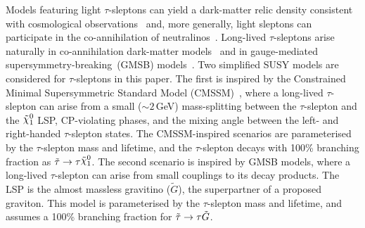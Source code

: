 Models featuring light $\tau$-sleptons can yield a dark-matter relic density consistent with cosmological observations~\cite{Vasquez:2011} and, more generally, light sleptons can participate in the co-annihilation of neutralinos~\cite{Belanger:2004ag,King:2007vh}. Long-lived $\tau$-sleptons arise naturally in co-annihilation dark-matter models~\cite{Ellis:1998kh,Jittoh:2005pq,Kaneko:2008re} and in gauge-mediated supersymmetry-breaking~(GMSB) 
models~\cite{Dine:1981gu,AlvarezGaume:1981wy,Nappi:1982hm}.
Two simplified SUSY models are considered for $\tau$-sleptons in this paper. The first is inspired by the Constrained Minimal Supersymmetric Standard Model (CMSSM)~\cite{Chamseddine:1982jx,Barbieri:1982eh,Kane:1993td}, where a long-lived $\tau$-slepton can arise from a small (${\sim}2$\,GeV) mass-splitting between the $\tau$-slepton and the $\ninoone$ LSP, CP-violating phases, and the mixing angle between the left- and right-handed $\tau$-slepton states. The CMSSM-inspired scenarios are parameterised by the $\tau$-slepton mass and lifetime, and the $\tau$-slepton decays with 100\% branching fraction as $\stau\rightarrow\tau\ninoone$.
The second scenario is inspired by GMSB models, where a long-lived $\tau$-slepton can arise from small couplings to its decay products. The LSP is the almost massless gravitino ($\tilde{G}$), the superpartner of a proposed graviton. This model is parameterised by the $\tau$-slepton mass and lifetime, and assumes a 100\% branching fraction for $\tilde{\tau}\rightarrow\tau\tilde{G}$. 

